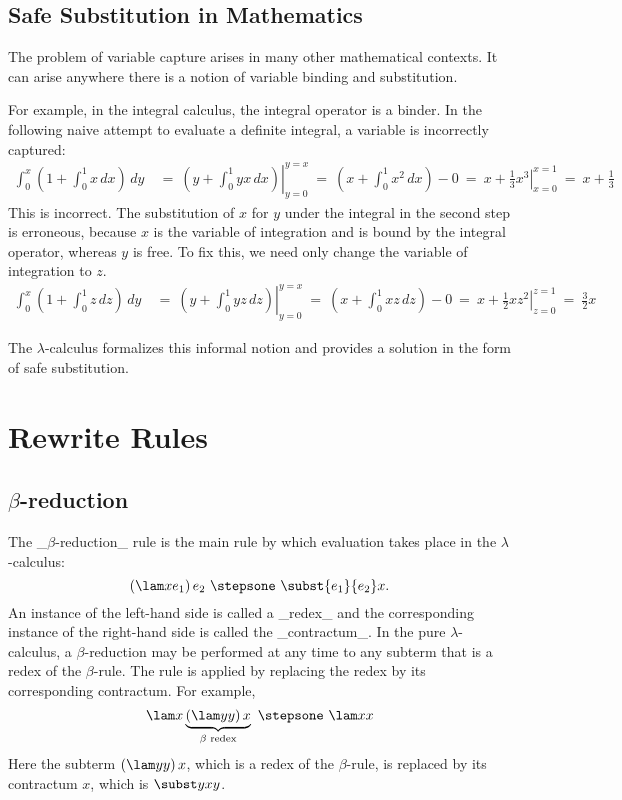 \subsection{Safe Substitution in Mathematics}

The problem of variable capture arises in many other mathematical contexts.
It can arise anywhere there is a notion of variable binding and substitution.

For example, in the integral calculus, the integral operator is a binder. In the following
naive attempt to evaluate a definite integral, a variable is incorrectly captured:
\begin{align*}
 \int_{0}^{x}(1+\int_0^1 x\,dx)\,dy\ &=\ \left.(y+\int_0^1 yx\,dx)
 \right|_{y=0}^{y=x}\ =\ (x+\int_0^1 x^2\,dx) - 0\ =\ x+\left.\textstyle{\frac 13}{x^3}\right|_{x=0}^{x=1}\ =\ x + \textstyle{\frac 13}
\end{align*}
This is incorrect. The substitution of $x$ for $y$ under the integral in the second step is erroneous, because $x$ is the variable of integration and is bound by the integral operator, whereas $y$ is free. To fix this, we need only change the variable of integration to $z$.
\begin{align*}
 \int_{0}^{x}(1+\int_0^1 z\,dz)\,dy\ &=\ \left.(y+\int_0^1 yz\,dz)
 \right|_{y=0}^{y=x}\ =\ (x+\int_0^1 xz\,dz) - 0\ =\ x+\left.\textstyle{\frac 12}{xz^2}\right|_{z=0}^{z=1}\ =\ \textstyle{\frac 32}x
\end{align*}

The $\lambda$-calculus formalizes this informal notion and provides a solution in the form of safe substitution.

\section{Rewrite Rules}

\subsection{$\beta$-reduction}

The _$\beta$-reduction_ rule is the main rule by which evaluation takes place in the $\lambda$-calculus:
\[
(\lam x{e_1})\,e_2\ \stepsone\ \subst{e_1}{e_2}x.
\]
An instance of the left-hand side is called a _redex_ and the corresponding instance of the right-hand side is called the _contractum_. In the pure $\lambda$-calculus, a $\beta$-reduction may be performed at any time to any subterm that is a redex of the $\beta$-rule. The rule is applied by replacing the redex by its corresponding contractum. For example,
\[
\lam x\underbrace{(\lam yy)\,x}_{\beta\text{ redex}}\ \stepsone\ \lam xx
\]
Here the subterm $(\lam yy)\,x$, which is a redex of the $\beta$-rule, is replaced by its contractum $x$, which is $\subst yxy$.

